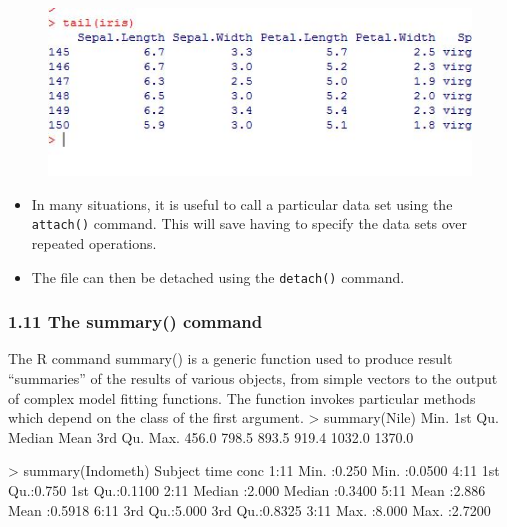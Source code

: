\documentclass{beamer}
\begin{document}
 \begin{frame}
 	\begin{figure}
 		\centering
 		\includegraphics[width=0.7\linewidth]{images/iristail}     
 	\end{figure}
 \end{frame}   
 \begin{frame}
 	\begin{itemize}
 		\item In many situations, it is useful to call a particular data set using the \texttt{attach()} command. This
 		will save having to specify the data sets over repeated operations. 
 		\item The file can then be detached
 		using the \texttt{detach()} command.
 	\end{itemize}
 	
 	
 	
 \end{frame}
 \begin{frame}
 	\frametitle{1.11 The summary() command}
 	The R command summary() is a generic function used to produce result “summaries” of the
 	results of various objects, from simple vectors to the output of complex model fitting functions.
 	The function invokes particular methods which depend on the class of the first argument.
 	> summary(Nile)
 	Min. 1st Qu. Median Mean 3rd Qu. Max.
 	456.0 798.5 893.5 919.4 1032.0 1370.0
 \end{frame}
 \begin{frame}
 	> summary(Indometh)
 	Subject time conc
 	1:11 Min. :0.250 Min. :0.0500
 	4:11 1st Qu.:0.750 1st Qu.:0.1100
 	2:11 Median :2.000 Median :0.3400
 	5:11 Mean :2.886 Mean :0.5918
 	6:11 3rd Qu.:5.000 3rd Qu.:0.8325
 	3:11 Max. :8.000 Max. :2.7200
 \end{frame}
 
\end{document}

